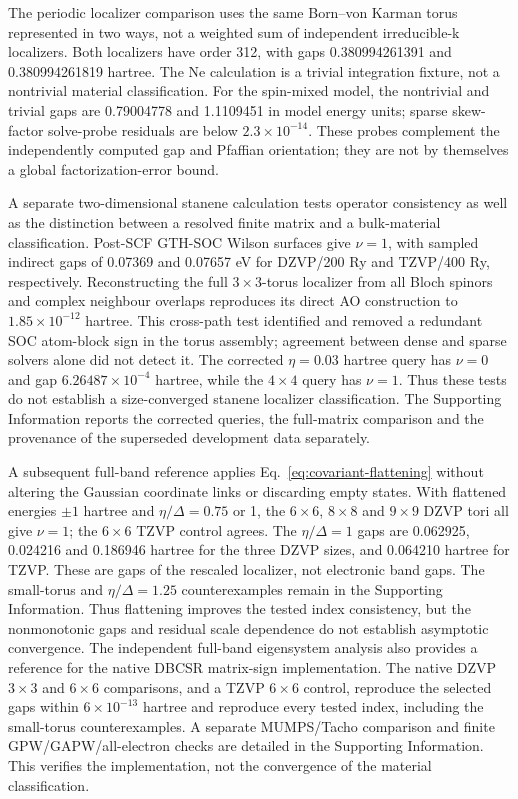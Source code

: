 The periodic localizer comparison uses the same Born--von Karman
torus represented in two ways, not a weighted sum of independent
irreducible-k localizers. Both localizers have order 312, with gaps
0.380994261391 and 0.380994261819 hartree. The Ne calculation is a
trivial integration fixture, not a nontrivial material classification.
For the spin-mixed model, the nontrivial and trivial gaps are
0.79004778 and 1.1109451 in model energy units; sparse skew-factor
solve-probe residuals are below $2.3\times10^{-14}$. These probes
complement the independently computed gap and Pfaffian orientation;
they are not by themselves a global factorization-error bound.

A separate two-dimensional stanene calculation tests operator
consistency as well as the distinction between a resolved finite
matrix and a bulk-material classification. Post-SCF GTH-SOC Wilson
surfaces give $\nu=1$, with sampled indirect gaps of 0.07369 and
0.07657 eV for DZVP/200 Ry and TZVP/400 Ry, respectively.
Reconstructing the full $3\times3$-torus localizer from all Bloch
spinors and complex neighbour overlaps reproduces its direct AO
construction to $1.85\times10^{-12}$ hartree. This cross-path test
identified and removed a redundant SOC atom-block sign in the torus
assembly; agreement between dense and sparse solvers alone did not
detect it. The corrected $\eta=0.03$ hartree query has $\nu=0$ and
gap $6.26487\times10^{-4}$ hartree, while the $4\times4$ query has
$\nu=1$. Thus these tests do not establish a size-converged stanene
localizer classification. The Supporting Information reports the
corrected queries, the full-matrix comparison and the provenance of
the superseded development data separately.

A subsequent full-band reference applies
Eq.~\eqref{eq:covariant-flattening} without altering the Gaussian
coordinate links or discarding empty states. With flattened energies
$\pm1$ hartree and $\eta/\Delta=0.75$ or 1, the $6\times6$,
$8\times8$ and $9\times9$ DZVP tori all give $\nu=1$;
the $6\times6$ TZVP control agrees. The $\eta/\Delta=1$ gaps
are 0.062925, 0.024216 and 0.186946 hartree for the three DZVP sizes,
and 0.064210 hartree for TZVP. These are gaps of the rescaled
localizer, not electronic band gaps. The small-torus and
$\eta/\Delta=1.25$ counterexamples remain in the Supporting
Information. Thus flattening improves the tested index consistency,
but the nonmonotonic gaps and residual scale dependence do not
establish asymptotic convergence. The independent full-band
eigensystem analysis also provides a reference for the native DBCSR
matrix-sign implementation. The native DZVP $3\times3$ and
$6\times6$ comparisons, and a TZVP $6\times6$ control,
reproduce the selected gaps within
$6\times10^{-13}$ hartree and reproduce every tested index,
including the small-torus counterexamples. A separate MUMPS/Tacho
comparison and finite GPW/GAPW/all-electron checks are detailed in
the Supporting Information. This verifies the implementation, not
the convergence of the material classification.


